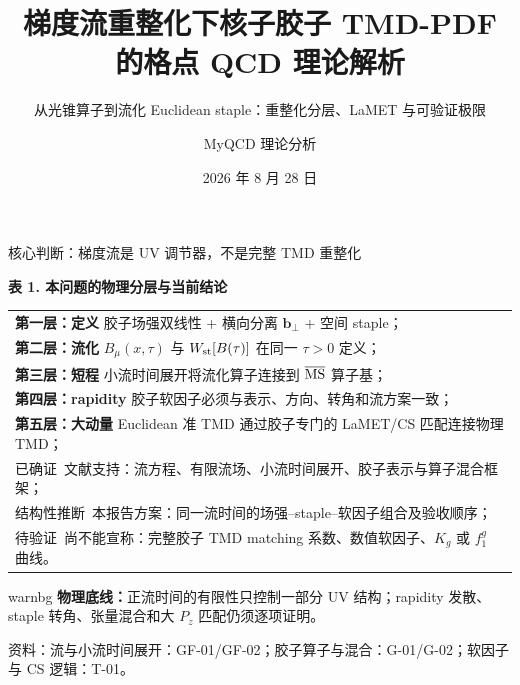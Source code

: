 \documentclass[UTF8,aspectratio=169,11pt]{ctexbeamer}
\title[梯度流与核子胶子 TMD]{梯度流重整化下核子胶子 TMD-PDF 的格点 QCD 理论解析}
\subtitle{从光锥算子到流化 Euclidean staple：重整化分层、LaMET 与可验证极限}
\author[MyQCD 理论分析]{MyQCD 理论分析}
\institute{理论物理视角：定义、尺度窗口与证据边界}
\date{2026 年 8 月 28 日}
\newcommand{\source}[1]{%
  \par\vspace{-0.08em}%
  \noindent\parbox[t]{0.97\linewidth}{\raggedright\scriptsize\color{muted}资料：#1}\par}
\newcommand{\verified}{\textcolor{evidence}{已确证}}
\newcommand{\inferred}{\textcolor{accent}{结构性推断}}
\newcommand{\unverified}{\textcolor{warning}{待验证}}
\begin{document}
\begin{frame}[plain]
  \titlepage
\end{frame}

\begin{frame}[t]{核心判断：梯度流是 UV 调节器，不是完整 TMD 重整化}
  \begin{center}
  \textbf{表 1. 本问题的物理分层与当前结论}
  \vspace{0.15em}
  \begin{tabular}{@{}p{\linewidth}@{}}
    \toprule
    \textbf{第一层：定义} \quad 胶子场强双线性 + 横向分离 $\boldsymbol b_\perp$ + 空间 staple；\\
    \textbf{第二层：流化} \quad $B_\mu(x,\tau)$ 与 $W_{\rm st}[B(\tau)]$ 在同一 $\tau>0$ 定义；\\
    \textbf{第三层：短程} \quad 小流时间展开将流化算子连接到 $\overline{\rm MS}$ 算子基；\\
    \textbf{第四层：rapidity} \quad 胶子软因子必须与表示、方向、转角和流方案一致；\\
    \textbf{第五层：大动量} \quad Euclidean 准 TMD 通过胶子专门的 LaMET/CS 匹配连接物理 TMD；\\
    \midrule
    \verified\ 文献支持：流方程、有限流场、小流时间展开、胶子表示与算子混合框架；\\
    \inferred\ 本报告方案：同一流时间的场强--staple--软因子组合及验收顺序；\\
    \unverified\ 尚不能宣称：完整胶子 TMD matching 系数、数值软因子、$K_g$ 或 $f_1^g$ 曲线。\\
    \bottomrule
  \end{tabular}
  \end{center}
  \vfill
  \begin{beamercolorbox}[wd=0.96\textwidth,sep=0.55em,rounded=true]{warnbg}
    \textbf{物理底线：}正流时间的有限性只控制一部分 UV 结构；rapidity 发散、staple 转角、张量混合和大 $P_z$ 匹配仍须逐项证明。
  \end{beamercolorbox}
  \source{流与小流时间展开：GF-01/GF-02；胶子算子与混合：G-01/G-02；软因子与 CS 逻辑：T-01。}
\end{frame}
\end{document}

